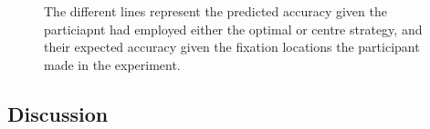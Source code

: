 \documentclass[12pt]{article}
\begin{document}
\begin{figure}
	\centering
	\captionsetup{justification=centering}
	\quad
	\caption{The different lines represent the predicted accuracy given the particiapnt had employed either the optimal or centre strategy, and their expected accuracy given the fixation locations the participant made in the experiment.}
	\label{fig:Session2-prob-accresults}
\end{figure}

\subsection*{Discussion}
\end{document}
